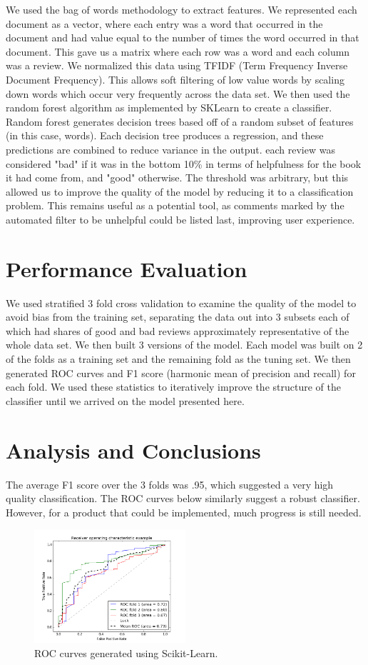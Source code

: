 \documentclass[twocolumn]{article}
\begin{document}
We used the bag of words methodology to extract features. We represented each document as a vector, where each entry was a word that occurred in the document and had value equal to the number of times the word occurred in that document. This gave us a matrix where each row was a word and each column was a review. We normalized this data using TFIDF (Term Frequency Inverse Document Frequency). This allows soft filtering of low value words by scaling down words which occur very frequently across the data set. We then used the random forest algorithm as implemented by SKLearn to create a classifier. Random forest generates decision trees based off of a random subset of features (in this case, words). Each decision tree produces a regression, and these predictions are combined to reduce variance in the output. each review was considered "bad" if it was in the bottom 10\% in terms of helpfulness for the book it had come from, and "good" otherwise. The threshold was arbitrary, but this allowed us to improve the quality of the model by reducing it to a classification problem. This remains useful as a potential tool, as comments marked by the automated filter to be unhelpful could be listed last, improving user experience.

\section{Performance Evaluation}

We used stratified 3 fold cross validation to examine the quality of the model to avoid bias from the training set, separating the data out into 3 subsets each of which had shares of good and bad reviews approximately representative of the whole data set. We then built 3 versions of the model. Each model was built on 2 of the folds as a training set and the remaining fold as the tuning set. We then generated ROC curves and F1 score (harmonic mean of precision and recall) for each fold. We used these statistics to iteratively improve the structure of the classifier until we arrived on the model presented here.

\section{Analysis and Conclusions}
The average F1 score over the 3 folds was .95, which suggested a very high quality classification. The ROC curves below similarly suggest a robust classifier. However, for a product that could be implemented, much progress is still needed.
\begin{figure}[H]
	\includegraphics[width=0.5\textwidth]{ROC}
	\caption{ROC curves generated using Scikit-Learn.}
\end{figure}
\end{document}
